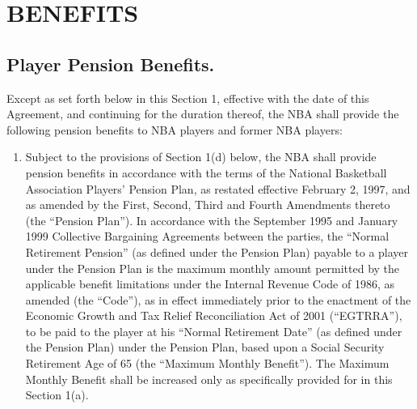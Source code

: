 \documentclass[
]{book}
\providecommand{\tightlist}{%
  \setlength{\itemsep}{0pt}\setlength{\parskip}{0pt}}
\begin{document}
\hypertarget{benefits}{%
\chapter{BENEFITS}\label{benefits}}

\hypertarget{player-pension-benefits.}{%
\section{Player Pension Benefits.}\label{player-pension-benefits.}}

Except as set forth below in this Section 1, effective with the date of this Agreement, and continuing for the duration thereof, the NBA shall provide the following pension benefits to NBA players and former NBA players:

\begin{enumerate}
\def\labelenumi{(\alph{enumi})}
\tightlist
\item
  Subject to the provisions of Section 1(d) below, the NBA shall provide pension benefits in accordance with the terms of the National Basketball Association Players' Pension Plan, as restated effective February 2, 1997, and as amended by the First, Second, Third and Fourth Amendments thereto (the ``Pension Plan''). In accordance with the September 1995 and January 1999 Collective Bargaining Agreements between the parties, the ``Normal Retirement Pension'' (as defined under the Pension Plan) payable to a player under the Pension Plan is the maximum monthly amount permitted by the applicable benefit limitations under the Internal Revenue Code of 1986, as amended (the ``Code''), as in effect immediately prior to the enactment of the Economic Growth and Tax Relief Reconciliation Act of 2001 (``EGTRRA''), to be paid to the player at his ``Normal Retirement Date'' (as defined under the Pension Plan) under the Pension Plan, based upon a Social Security Retirement Age of 65 (the ``Maximum Monthly Benefit''). The Maximum Monthly Benefit shall be increased only as specifically provided for in
  this Section 1(a).

\end{enumerate}
\end{document}
